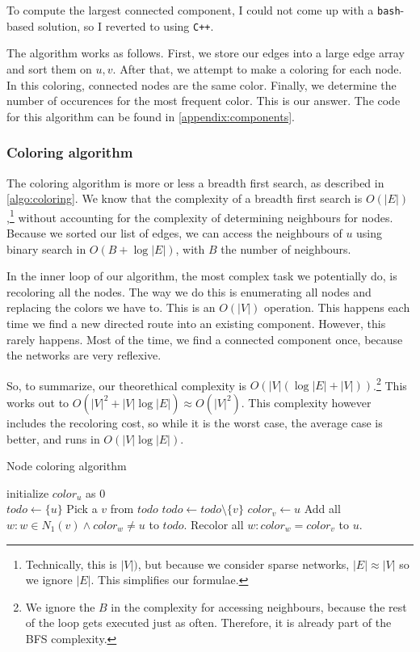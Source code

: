 \documentclass[12pt,a4paper,hidelinks]{article}
\begin{document}
To compute the largest connected component, I could not come up with a \texttt{bash}-based solution, so I reverted to using \texttt{C++}.

The algorithm works as follows. First, we store our edges into a large edge array and sort them on $u, v$. After that, we attempt to make a coloring for each node. In this coloring, connected nodes are the same color. Finally, we determine the number of occurences for the most frequent color. This is our answer. The code for this algorithm can be found in \autoref{appendix:components}.

\subsubsection*{Coloring algorithm}

The coloring algorithm is more or less a breadth first search, as described in \autoref{algo:coloring}. We know that the complexity of a breadth first search is $O(|E|)$,\footnote{Technically, this is $|V|)$, but because we consider sparse networks, $|E| \approx |V|$ so we ignore $|E|$. This simplifies our formulae.} without accounting for the complexity of determining neighbours for nodes. Because we sorted our list of edges, we can access the neighbours of $u$ using binary search in $O(B + \log |E|)$, with $B$ the number of neighbours.

In the inner loop of our algorithm, the most complex task we potentially do, is recoloring all the nodes. The way we do this is enumerating all nodes and replacing the colors we have to. This is an $O(|V|)$ operation. This happens each time we find a new directed route into an existing component. However, this rarely happens. Most of the time, we find a connected component once, because the networks are very reflexive.

So, to summarize, our theorethical complexity is $O(|V|(\log |E| + |V|))$.\footnote{We ignore the $B$ in the complexity for accessing neighbours, because the rest of the loop gets executed just as often. Therefore, it is already part of the BFS complexity.} This works out to $O(|V|^2 + |V|\log|E|) \approx O(|V|^2)$. This complexity however includes the recoloring cost, so while it is the worst case, the average case is better, and runs in $O(|V| \log |E|)$.

\begin{algorithm}
\caption{Node coloring algorithm}
\label{algo:coloring}
\begin{algorithmic}

	\State initialize $color_u$ as 0
\EndFor
\\
		\State $todo \gets \{u\}$
			\State Pick a $v$ from $todo$
			\State $todo \gets todo \setminus \{v\}$
					\State $color_v \gets u$
					\State Add all $w : w \in N_1(v) \land  color_w \neq u$ to $todo$.
				\Else
					\State Recolor all $w : color_w = color_v$ to $u$.
				\EndIf
			\EndIf
		\EndWhile
	\EndIf
\EndFor

\end{algorithmic}
\end{algorithm}
\end{document}
